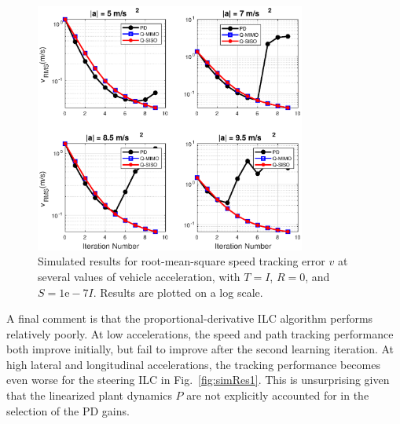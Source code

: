 \documentclass[9pt,shortpaper,twoside,web]{ieeecolor}
\begin{document}

\begin{figure}[tb]
\centering
\includegraphics[width=3.5in]{figures/simRes2.eps}
\caption[Simulated results for root-mean-square speed tracking error $v$ at several values of vehicle acceleration.]{Simulated results for root-mean-square speed tracking error $v$ at several values of vehicle acceleration, with $T = I$, $R = 0$, and $S = \mathrm{1e-7} I$.
Results are plotted on a log scale.}
\label{fig:simRes2}
\end{figure}

A final comment is that the proportional-derivative ILC algorithm performs relatively poorly. At low accelerations, the
speed and path tracking performance both improve initially, but fail to improve after the second learning iteration. At high
lateral and longitudinal accelerations, the tracking performance becomes even worse for the steering ILC in Fig.~\ref{fig:simRes1}.  
This is unsurprising given that the linearized plant dynamics $P$ are not explicitly accounted for in the selection of the PD gains. 

\end{document}
